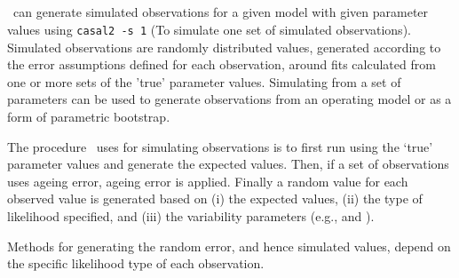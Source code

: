 {{{{\subsection{\label{sec:simulation-observations}}

\CNAME\ can generate simulated observations for a given model with given parameter values using \texttt{casal2 -s 1} (To simulate one set of simulated observations). Simulated observations are randomly distributed values, generated according to the error assumptions defined for each observation, around fits calculated from one or more sets of the 'true' parameter values. Simulating from a set of parameters can be used to generate observations from an operating model or as a form of parametric bootstrap. 

The procedure \CNAME\ uses for simulating observations is to first run using the `true' parameter values and generate the expected values. Then, if a set of observations uses ageing error, ageing error is applied. Finally a random value for each observed value is generated based on (i) the expected values, (ii) the type of likelihood specified, and (iii) the variability parameters (e.g.,  and ). 

Methods for generating the random error, and hence simulated values, depend on the specific likelihood type of each observation. 

}}}}

